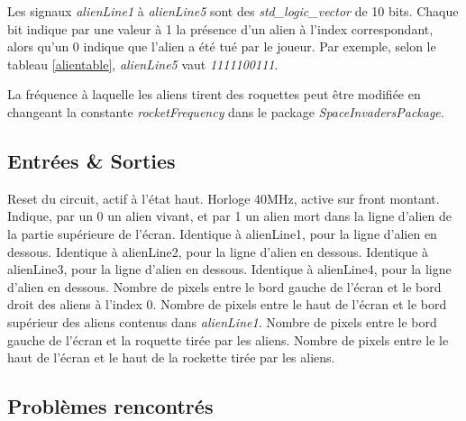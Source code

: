 \documentclass[french]{nakrule}
\begin{document}
Les signaux \emph{alienLine1} à \emph{alienLine5} sont des
\emph{std\_logic\_vector} de 10 bits. Chaque bit indique par une valeur à 1 la
présence d'un alien à l'index correspondant, alors qu'un 0 indique que l'alien a
été tué par le joueur. Par exemple, selon le tableau \ref{alientable},
\emph{alienLine5} vaut \emph{1111100111}.

La fréquence à laquelle les aliens tirent des roquettes peut être modifiée en
changeant la constante \emph{rocketFrequency} dans le package \emph{SpaceInvadersPackage}.

\clearpage

\subsection{Entrées \& Sorties}
\label{subsec:Entrees_Sorties_alienRocket}

\begin{descr}
   Reset du circuit, actif à l'état haut.
   Horloge 40MHz, active sur front montant.
   Indique, par un 0 un alien vivant, et par 1 un alien
  mort dans la ligne d'alien de la partie supérieure de l'écran.
   Identique à alienLine1, pour la ligne d'alien en dessous.
   Identique à alienLine2, pour la ligne d'alien en dessous.
   Identique à alienLine3, pour la ligne d'alien en dessous.
   Identique à alienLine4, pour la ligne d'alien en dessous.
   Nombre de pixels entre le bord gauche de l'écran et le
  bord droit des aliens à l'index 0.
   Nombre de pixels entre le haut de l'écran et le bord
  supérieur des aliens contenus dans \emph{alienLine1}.
   Nombre de pixels entre le bord gauche de l'écran et
  la roquette tirée par les aliens.
   Nombre de pixels entre le le haut de l'écran et le
  haut de la rockette tirée par les aliens.
\end{descr}

\subsection{Problèmes rencontrés}
\label{subsec:Problemes_rencontres_alienRocket}
\end{document}
